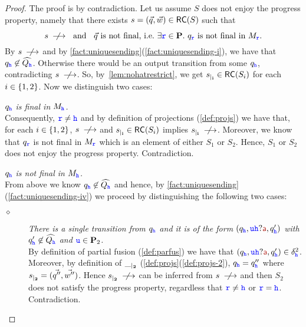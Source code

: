 \begin{proof}
The proof is by contradiction.
Let us assume $S$ does not enjoy the progress property, namely that there exists 
 $s= (\vec{q},\vec{w}) \in \mathsf{RC}(S)$ such that
 \begin{equation}
 \label{eq:snotprogr}
 \text{$s\stackrel{}{\;\;\not\!\!\longrightarrow}\hspace{2mm}$ and $\hspace{2mm}\vec{q}$ is not final, i.e.\
 $\exists { \ensuremath{\mathtt{\color{blue}{ {r}}}} }\in\mathbf{P}. ~ q_{\mathtt{\color{blue}{ {r}}}} \text{ is not final in } M_{\mathtt{\color{blue}{ {r}}}}$.}
\end{equation}
By $s\stackrel{}{\;\;\not\!\!\longrightarrow}$  and by \cref{fact:uniquesending}(\ref{fact:uniquesending-i}), 
we have that $q_{{\mathtt{\color{blue}{ {h}}}}}\not\in\widehat{Q_{{\mathtt{\color{blue}{ {h}}}}}}$. 
Otherwise there would be an output transition from some $q_{{\mathtt{\color{blue}{ {h}}}}}$, contradicting $s\stackrel{}{\;\;\not\!\!\longrightarrow}$.
So, by~\cref{lem:nohatrestrict}, we get ${s}_{\mid_{\mathbf{i}}}\in \mathsf{RC}(S_i)$ for each $i\in \{1,2\}$.
Now we distinguish two cases:
\begin{description}
%
\item \emph{$q_{{\mathtt{\color{blue}{ {h}}}}}$ is final in $M_{{\mathtt{\color{blue}{ {h}}}}}$.}\\
Consequently, ${\mathtt{\color{blue}{ {r}}}}\neq{ \ensuremath{\mathtt{\color{blue}{ {h}}}} }$ and by definition of projections (\cref{def:projs}) we have that,
for each $i\in\{1,2\}$, $s\stackrel{}{\;\;\not\!\!\longrightarrow}$ and ${s}_{\mid_{\mathbf{i}}}\in \mathsf{RC}(S_i)$ implies ${s}_{\mid_{\mathbf{i}}}\stackrel{}{\;\;\not\!\!\longrightarrow}$. Moreover, we know that $q_{\mathtt{\color{blue}{ {r}}}}$ is not final in $M_{\mathtt{\color{blue}{ {r}}}}$ which is
an element of either $S_1$ or $S_2$. Hence, $S_1$ or $S_2$ does not enjoy the progress property. Contradiction.
%
\item \emph{$q_{{\mathtt{\color{blue}{ {h}}}}}$ is not final in $M_{{\mathtt{\color{blue}{ {h}}}}}$.}\\
From above we know  $q_{{\mathtt{\color{blue}{ {h}}}}}\not\in\widehat{Q_{{\mathtt{\color{blue}{ {h}}}}}}$ and hence, 
by \cref{fact:uniquesending}(\ref{fact:uniquesending-iv}) 
we proceed by distinguishing the following two cases:
\begin{description}
%
\item[\underline{$\diamond$}] \emph{There is a single transition from $q_{\mathtt{\color{blue}{ {h}}}}$ and it is of the form
$(q_{\HH},\ttu{\HH}?\msg[a],q'_\hh)$ with $q'_{\mathtt{\color{blue}{ {h}}}}\not\in\widehat{Q_{\mathtt{\color{blue}{ {h}}}}}$ and ${\mathtt{\color{blue}{ {u}}}}\in\mathbf{P}_2$.}\\[1mm]
By definition of partial fusion (\cref{def:parfus})
we have that $(q_{\HH},\ttu{\HH}?\msg[a],q'_\hh)\in\delta^2_\hh$.
Moreover, by definition of ${\_}_{\mid_{\mathbf{2}}}$ (\cref{def:projs}(\ref{def:projs-2}), 
$q_{\mathtt{\color{blue}{ {h}}}}=q''_{\mathtt{\color{blue}{ {h}}}}$ where ${s}_{\mid_{\mathbf{2}}}=(\vec{q''},\vec{w''})$.
Hence ${s}_{\mid_{\mathbf{2}}}\stackrel{}{\;\;\not\!\!\longrightarrow}$ can be inferred from $s\stackrel{}{\;\;\not\!\!\longrightarrow}$ and then 
$S_2$ does not satisfy the progress property, regardless that ${\mathtt{\color{blue}{ {r}}}}\neq{ \ensuremath{\mathtt{\color{blue}{ {h}}}} }$ or ${\mathtt{\color{blue}{ {r}}}}={\mathtt{\color{blue}{ {h}}}}$. Contradiction.

\end{description}
\end{description}
\end{proof}
